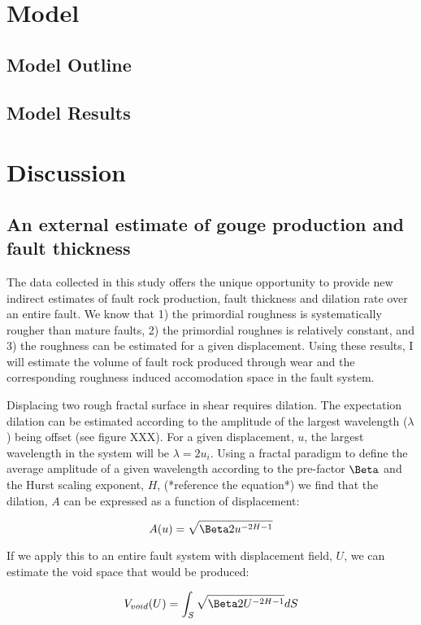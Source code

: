 \documentclass[12pt,a4paper]{article}
\begin{document}
\section{Model}
	\subsection{Model Outline}
	\subsection{Model Results}

\section{Discussion}
	\subsection{An external estimate of gouge production and fault thickness}

The data collected in this study offers the unique opportunity to provide new indirect estimates of fault rock production, fault thickness and dilation rate over an entire fault. We know that 1) the primordial roughness is systematically rougher than mature faults, 2) the primordial roughnes is relatively constant, and 3) the roughness can be estimated for a given displacement. Using these results, I will estimate the volume of fault rock produced through wear and the corresponding roughness induced accomodation space in the fault system.

Displacing two rough fractal surface in shear requires dilation. The expectation dilation can be estimated according to the amplitude of the largest wavelength ($\lambda$) being offset (see figure XXX). For a given displacement, $u$, the largest wavelength in the system will be $\lambda = 2u_i$. Using a fractal paradigm to define the average amplitude of a given wavelength according to the pre-factor $\Beta$ and the Hurst scaling exponent, $H$, (*reference the equation*) we find that the dilation, $A$ can be expressed as a function of displacement:

\begin{equation}
	A(u) = \sqrt{\Beta 2u^{-2H-1}}
\end{equation}

If we apply this to an entire fault system with displacement field, $U$, we can estimate the void space that would be produced:

\begin{equation}
	V_{void}(U) = \int_S \sqrt{\Beta 2U^{-2H-1}}dS
\end{equation}
\end{document}
